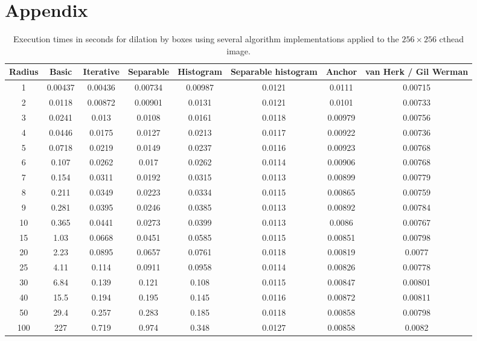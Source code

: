 \documentclass{InsightArticle}
\begin{document}


\nocite{ITKSoftwareGuide}

\appendix
\section*{Appendix}

\begin{table}[phtb]
\centering
\small
\begin{tabular}{cccccccc}
\hline
Radius	&	Basic	&	Iterative	&	Separable	&	Histogram	&	Separable histogram	&	Anchor	&	van Herk / Gil Werman	\\
\hline
1	&	0.00437	&	0.00436	&	0.00734	&	0.00987	&	0.0121	&	0.0111	&	0.00715	\\
2	&	0.0118	&	0.00872	&	0.00901	&	0.0131	&	0.0121	&	0.0101	&	0.00733	\\
3	&	0.0241	&	0.013	&	0.0108	&	0.0161	&	0.0118	&	0.00979	&	0.00756	\\
4	&	0.0446	&	0.0175	&	0.0127	&	0.0213	&	0.0117	&	0.00922	&	0.00736	\\
5	&	0.0718	&	0.0219	&	0.0149	&	0.0237	&	0.0116	&	0.00923	&	0.00768	\\
6	&	0.107	&	0.0262	&	0.017	&	0.0262	&	0.0114	&	0.00906	&	0.00768	\\
7	&	0.154	&	0.0311	&	0.0192	&	0.0315	&	0.0113	&	0.00899	&	0.00779	\\
8	&	0.211	&	0.0349	&	0.0223	&	0.0334	&	0.0115	&	0.00865	&	0.00759	\\
9	&	0.281	&	0.0395	&	0.0246	&	0.0385	&	0.0113	&	0.00892	&	0.00784	\\
10	&	0.365	&	0.0441	&	0.0273	&	0.0399	&	0.0113	&	0.0086	&	0.00767	\\
15	&	1.03	&	0.0668	&	0.0451	&	0.0585	&	0.0115	&	0.00851	&	0.00798	\\
20	&	2.23	&	0.0895	&	0.0657	&	0.0761	&	0.0118	&	0.00819	&	0.0077	\\
25	&	4.11	&	0.114	&	0.0911	&	0.0958	&	0.0114	&	0.00826	&	0.00778	\\
30	&	6.84	&	0.139	&	0.121	&	0.108	&	0.0115	&	0.00847	&	0.00801	\\
40	&	15.5	&	0.194	&	0.195	&	0.145	&	0.0116	&	0.00872	&	0.00811	\\
50	&	29.4	&	0.257	&	0.283	&	0.185	&	0.0118	&	0.00858	&	0.00798	\\
100	&	227	&	0.719	&	0.974	&	0.348	&	0.0127	&	0.00858	&	0.0082	\\
\hline
\hline
\end{tabular}
\caption{Execution times in seconds for dilation by boxes using several algorithm implementations applied to the $256 \times 256$ cthead image.\label{tab:perfDilation}}
\end{table}
\end{document}
